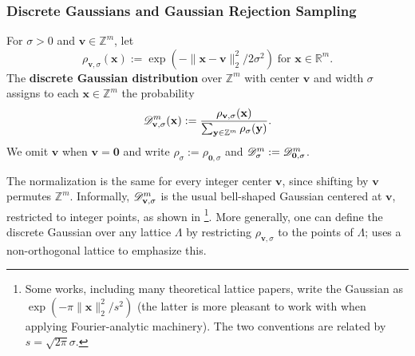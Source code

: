 \documentclass[../../book.tex]{subfiles}
\begin{document}
\subsubsection{Discrete Gaussians and Gaussian Rejection Sampling}

\begin{definition}\label{def:discrete-gaussian}
    For $\sigma > 0$ and $\mathbf{v} \in \mathbb{Z}^m$, let 
    \begin{equation*}
        \rho_{\mathbf{v},\sigma}(\mathbf{x}) := \exp\left(-\|\mathbf{x}-\mathbf{v}\|_2^2/2\sigma^2\right) \; \text{for $\mathbf{x} \in \mathbb{R}^m$}.   
    \end{equation*}
    The \textbf{discrete Gaussian distribution} over $\mathbb{Z}^m$ with center $\mathbf{v}$ and width $\sigma$ assigns to each $\mathbf{x} \in \mathbb{Z}^m$ the probability
    \begin{equation*}
        \mathscr{D}^m_{\mathbf{v},\sigma}(\mathbf{x}) := \frac{\rho_{\mathbf{v},\sigma}(\mathbf{x})}{\sum_{\mathbf{y} \in \mathbb{Z}^m}\rho_{\sigma}(\mathbf{y})}.
    \end{equation*}
    We omit $\mathbf{v}$ when $\mathbf{v} = \mathbf{0}$ and write $\rho_{\sigma} := \rho_{\mathbf{0},\sigma}$ and $\mathscr{D}^m_{\sigma} := \mathscr{D}^m_{\mathbf{0},\sigma}$.
\end{definition}

The normalization is the same for every integer center $\mathbf{v}$, since shifting by $\mathbf{v}$ permutes $\mathbb{Z}^m$.
Informally, $\mathscr{D}^m_{\mathbf{v},\sigma}$ is the usual bell-shaped Gaussian centered at $\mathbf{v}$, restricted to integer points, as shown in \footnote{Some works, including many theoretical lattice papers, write the Gaussian as $\exp(-\pi\|\mathbf{x}\|_2^2/s^2)$ (the latter is more pleasant to work with when applying Fourier-analytic machinery). The two conventions are related by $s = \sqrt{2\pi}\sigma$.}.
More generally, one can define the discrete Gaussian over any lattice $\Lambda$ by restricting $\rho_{\mathbf{v},\sigma}$ to the points of $\Lambda$;  uses a non-orthogonal lattice to emphasize this.
\end{document}
